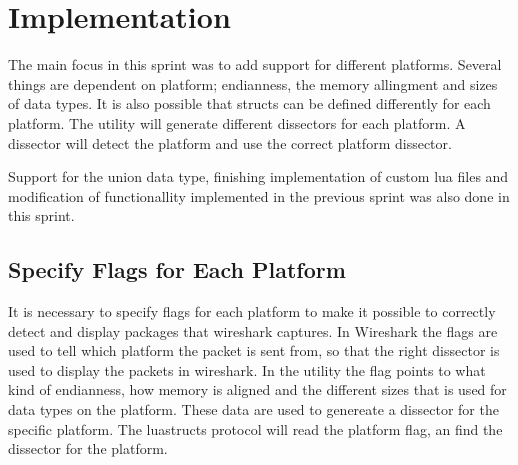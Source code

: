 \begin{table}[htbp] \footnotesize \center
\caption{User Stories - Sprint 3 Part 4\label{tab:req:stories10}}
\noindent{}
\end{table}


\section{Implementation}
\label{sec:sp3:impl}
The main focus in this sprint was to add support for different platforms. Several 
things are dependent on platform; \gls{endianness}, the memory allingment and sizes 
of data types. It is also possible that \glspl{struct} can be defined differently for 
each platform. The \gls{utility} will generate different \glspl{dissector} for each 
platform. A \gls{dissector} will detect the platform and use the correct 
platform \gls{dissector}.

Support for the \gls{union} data type, finishing implementation of custom \Gls{lua} files 
and modification of functionallity implemented in the previous sprint was also 
done in this sprint.

\subsection{Specify Flags for Each Platform}
It is necessary to specify flags for each platform to make it possible to 
correctly detect and display packages that wireshark captures. In Wireshark
the flags are used to tell which platform the \gls{packet} is sent from, so that 
the right \gls{dissector} is used to display the \glspl{packet} in \Gls{wireshark}. In the 
\gls{utility} the flag points to what kind of \gls{endianness}, how memory is aligned and 
the different sizes that is used for data types on the platform. These data 
are used to genereate a \gls{dissector} for the specific platform. The 
luastructs protocol will read the platform flag, an find the dissector for the 
platform.

